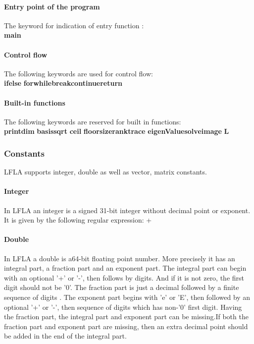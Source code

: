 \documentclass[12pt]{article} %
\begin{document}
\paragraph{Entry point of the program}  The keyword  for indication of  entry function :\\ 
\textbf{main}
\paragraph{Control flow}The following keywords are used for control flow:\\
 \textbf{if}\quad \textbf{else} \quad\textbf{for}\quad\textbf{while}\quad\textbf{break}\quad\textbf{continue}\quad\textbf{return}

\paragraph{Built-in functions} The following keywords are reserved for built in functions:\\
\textbf{print}\quad \textbf{dim} \quad \textbf{basis}\quad \textbf{sqrt} \quad \textbf{ceil} \quad \textbf{floor}\quad \textbf{size}\quad \textbf{rank}\quad \textbf{trace}
\quad\textbf{eigenValue}\quad\textbf{solve}\quad \textbf{image} \quad\textbf{L} 

\subsubsection{Constants}
LFLA supports integer, double as well as vector, matrix constants.   
\paragraph{Integer}  In LFLA an integer  is a signed 31-bit  integer without decimal point or exponent. It is given by  the following regular expression:
\newline
 [+ - ][ '0' -  '9 ']+
\paragraph{Double} In LFLA a double is a64-bit floating point number. More precisely it has an integral part, a fraction part and an exponent part. The integral part can begin with an optional '+' or '-', then follows by digits. And if it is not zero, the first digit should not be '0'. The fraction part is just a decimal followed by a finite sequence of digits . The exponent part begins with 'e' or 'E', then followed by an optional '+' or '-', then sequence of digits which has non-'0' first digit. Having the fraction part, the integral part and exponent part can be missing.If both the fraction part and exponent part are missing, then an extra decimal point should be added in the end of the integral part.
\end{document}
